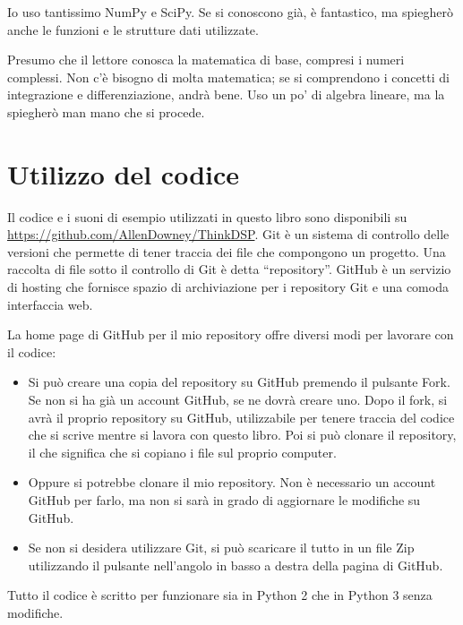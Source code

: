 \documentclass[12pt]{book} \usepackage[width=5.5in,height=8.5in, hmarginratio=3:2,vmarginratio=1:1]{geometry}
\begin{document}
Io uso tantissimo NumPy e SciPy. Se si conoscono già, è fantastico, ma spiegherò anche le funzioni e le strutture dati utilizzate.

Presumo che il lettore conosca la matematica di base, compresi i numeri complessi. Non c'è bisogno di molta matematica; se si comprendono i concetti di integrazione e differenziazione, andrà bene. Uso un po' di algebra lineare, ma la spiegherò man mano che si procede.

\section{Utilizzo del codice} \label{code} 

Il codice e i suoni di esempio utilizzati in questo libro sono disponibili su \url{https://github.com/AllenDowney/ThinkDSP}. Git è un sistema di controllo delle versioni che permette di tener traccia dei file che compongono un progetto. Una raccolta di file sotto il controllo di Git è detta ``repository''. GitHub è un servizio di hosting che fornisce spazio di archiviazione per i repository Git e una comoda interfaccia web.    

La home page di GitHub per il mio repository offre diversi modi per lavorare con il codice:

\begin{itemize} 

\item Si può creare una copia del repository su GitHub premendo il pulsante {\sf Fork}. Se non si ha già un account GitHub, se ne dovrà creare uno. Dopo il fork, si avrà il proprio repository su GitHub, utilizzabile per tenere traccia del codice che si scrive mentre si lavora con questo libro. Poi si può clonare il repository, il che significa che si copiano i file sul proprio computer.  

\item Oppure si potrebbe clonare il mio repository. Non è necessario un account GitHub per farlo, ma non si sarà in grado di aggiornare le modifiche su GitHub.  

\item Se non si desidera utilizzare Git, si può scaricare il tutto in un file Zip utilizzando il pulsante nell'angolo in basso a destra della pagina di GitHub.

\end{itemize} 

Tutto il codice è scritto per funzionare sia in Python 2 che in Python 3 senza modifiche.
\end{document}
